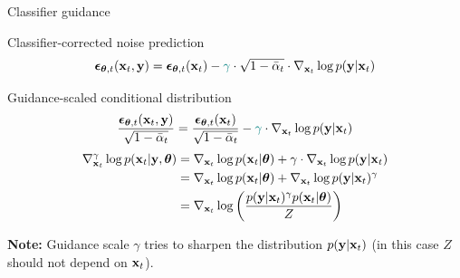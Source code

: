 \begin{frame}{Classifier guidance}
	\begin{block}{Classifier-corrected noise prediction}
		\vspace{-0.3cm}
		\[
			\boldsymbol{\epsilon}_{\boldsymbol{\theta}, t}(\mathbf{x}_t, \mathbf{y}) = \boldsymbol{\epsilon}_{\boldsymbol{\theta}, t}(\mathbf{x}_t) - {\color{teal}\gamma} \cdot \sqrt{1 - \bar{\alpha}_t} \cdot \nabla_{\mathbf{x}_t} \log p(\mathbf{y} | \mathbf{x}_t)
		\]
		\vspace{-0.7cm}
	\end{block}
	\begin{block}{Guidance-scaled conditional distribution}
		\[
			\frac{\boldsymbol{\epsilon}_{\boldsymbol{\theta}, t}(\mathbf{x}_t, \mathbf{y})}{\sqrt{1 - \bar{\alpha}_t}} = \frac{\boldsymbol{\epsilon}_{\boldsymbol{\theta}, t}(\mathbf{x}_t)}{\sqrt{1 - \bar{\alpha}_t}} - {\color{teal}\gamma} \cdot \nabla_{\mathbf{x}_t} \log p(\mathbf{y} | \mathbf{x}_t)
		\]
		\vspace{-0.5cm}
		\begin{align*}
			\nabla_{\mathbf{x}_t}^{\gamma} \log p(\mathbf{x}_t | \mathbf{y}, \boldsymbol{\theta}) &= \nabla_{\mathbf{x}_t} \log p(\mathbf{x}_t | \boldsymbol{\theta}) + \gamma \cdot \nabla_{\mathbf{x}_t} \log p(\mathbf{y} | \mathbf{x}_t) \\
			&= \nabla_{\mathbf{x}_t} \log p(\mathbf{x}_t | \boldsymbol{\theta}) + \nabla_{\mathbf{x}_t} \log p(\mathbf{y} | \mathbf{x}_t)^{\gamma} \\
			&= \nabla_{\mathbf{x}_t} \log \left( \frac{p(\mathbf{y} | \mathbf{x}_t)^{\gamma} p(\mathbf{x}_t | \boldsymbol{\theta})}{Z} \right)
		\end{align*}
		\vspace{-0.5cm}
	\end{block}
	\textbf{Note:} Guidance scale $\gamma$ tries to sharpen the distribution $p(\mathbf{y} | \mathbf{x}_t)$ (in this case $Z$ should not depend on $\mathbf{x}_t$).
\end{frame}
